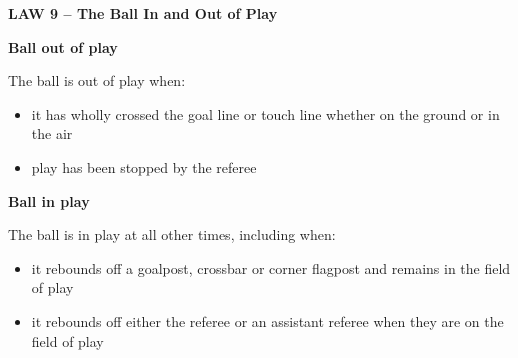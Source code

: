 \clearpage
\sffamily
{\bfseries\color[rgb]{0.4,0.4,0.4}
LAW 9 -- The Ball In and Out of Play}

\bigskip

{\bfseries Ball out of play}

\headlinebox

The ball is out of play when:

\begin{itemize}
\item it has wholly crossed the goal line or touch line whether on the ground or in the air
\item play has been stopped by the referee
\end{itemize}

{\bfseries Ball in play }

\headlinebox

The ball is in play at all other times, including when:

\begin{itemize}
\item it rebounds off a goalpost, crossbar or corner flagpost and remains in the field of play
\item it rebounds off either the referee or an assistant referee when they are on the field of play
\end{itemize}